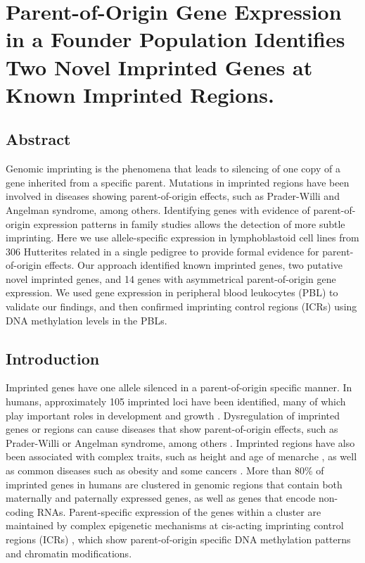 \chapter{Parent-of-Origin Gene Expression in a Founder Population Identifies Two Novel Imprinted Genes at Known Imprinted Regions.}\label{ch:imprinted}
\section[Abstract]{Abstract\footnotemark}


Genomic imprinting is the phenomena that leads to silencing of one copy of a gene inherited from a specific parent. Mutations in imprinted regions have been involved in diseases showing parent-of-origin effects, such as Prader-Willi and Angelman syndrome, among others. Identifying genes with evidence of parent-of-origin expression patterns in family studies allows the detection of more subtle imprinting. Here we use allele-specific expression in lymphoblastoid cell lines from 306 Hutterites related in a single pedigree to provide formal evidence for parent-of-origin effects. Our approach identified known imprinted genes, two putative novel imprinted genes, and 14 genes with asymmetrical parent-of-origin gene expression. We used gene expression in peripheral blood leukocytes (PBL) to validate our findings, and then confirmed imprinting control regions (ICRs) using DNA methylation levels in the PBLs.



\section{Introduction}\label{ch03-introduction}
	Imprinted genes have one allele silenced in a parent-of-origin specific manner. In humans, approximately 105 imprinted loci have been identified, many of which play important roles in development and growth \cite{Falls1999,Peters2014}. Dysregulation of imprinted genes or regions can cause diseases that show parent-of-origin effects, such as Prader-Willi or Angelman syndrome, among others \cite{Peters2014}. Imprinted regions have also been associated with complex traits, such as height and age of menarche \cite{Benonisdottir:2016dz,Zoledziewska:2015do}, as well as common diseases such as obesity and some cancers \cite{Peters2014}. More than 80\% of imprinted genes in humans are clustered in genomic regions that contain both maternally and paternally expressed genes, as well as genes that encode non-coding RNAs. Parent-specific expression of the genes within a cluster are maintained by complex epigenetic mechanisms at cis-acting imprinting control regions (ICRs) \cite{Kalish:2014gd}, which show parent-of-origin specific DNA methylation patterns and chromatin modifications.
	
